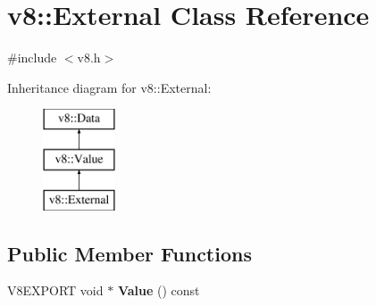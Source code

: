 \hypertarget{classv8_1_1_external}{}\section{v8\+:\+:External Class Reference}
\label{classv8_1_1_external}


{\ttfamily \#include $<$v8.\+h$>$}

Inheritance diagram for v8\+:\+:External\+:\begin{figure}[H]
\begin{center}
\leavevmode
\includegraphics[height=3.000000cm]{classv8_1_1_external}
\end{center}
\end{figure}
\subsection*{Public Member Functions}
\begin{DoxyCompactItemize}
\item 
\hypertarget{classv8_1_1_external_a17d89761a1fa35f7b526c3e1305738d1}{}V8\+E\+X\+P\+O\+R\+T void $\ast$ {\bfseries Value} () const \label{classv8_1_1_external_a17d89761a1fa35f7b526c3e1305738d1}

\end{DoxyCompactItemize}
